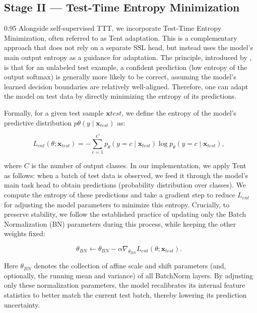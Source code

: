 \documentclass{article} %
\begin{document}
\subsection{Stage II — Test-Time Entropy Minimization}
\begin{spacing}{0.95}
Alongside self-supervised TTT, we incorporate Test-Time Entropy Minimization, often referred to as Tent adaptation. This is a complementary approach that does not rely on a separate SSL head, but instead uses the model’s main output entropy as a guidance for adaptation. The principle, introduced by \cite{wang2020tent}, is that for an unlabeled test example, a confident prediction (low entropy of the output softmax) is generally more likely to be correct, assuming the model’s learned decision boundaries are relatively well-aligned. Therefore, one can adapt the model on test data by directly minimizing the entropy of its predictions. 

Formally, for a given test sample $\mathbf{x}{test}$, we define the entropy of the model’s predictive distribution $p{\theta}(y \mid \mathbf{x}_{test})$ as:

\begin{equation}
    L_{ent}(\theta; \mathbf{x}_{test}) 
= - \sum_{c=1}^{C} p_{\theta}(y=c \mid \mathbf{x}_{test}) 
\log p_{\theta}(y=c \mid \mathbf{x}_{test}),
\end{equation}

where $C$ is the number of output classes. In our implementation, we apply Tent as follows: when a batch of test data is observed, we feed it through the model’s main task head to obtain predictions (probability distribution over classes). We compute the entropy of these predictions and take a gradient step to reduce $L_{ent}$ for adjusting the model parameters to minimize this entropy. Crucially, to preserve stability, we follow the established practice of updating only the Batch Normalization (BN) parameters during this process, while keeping the other weights fixed:

\begin{equation}
 \theta_{BN} \leftarrow \theta_{BN} - \alpha \nabla_{\theta_{BN}} L_{ent}(\theta; \mathbf{x}_{test}).
\end{equation}

Here $\theta_{BN}$ denotes the collection of affine scale and shift parameters (and, optionally, the running mean and variance) of all BatchNorm layers. By adjusting only these normalization parameters, the model recalibrates its internal feature statistics to better match the current test batch, thereby lowering its prediction uncertainty.


\end{spacing}
\end{document}
